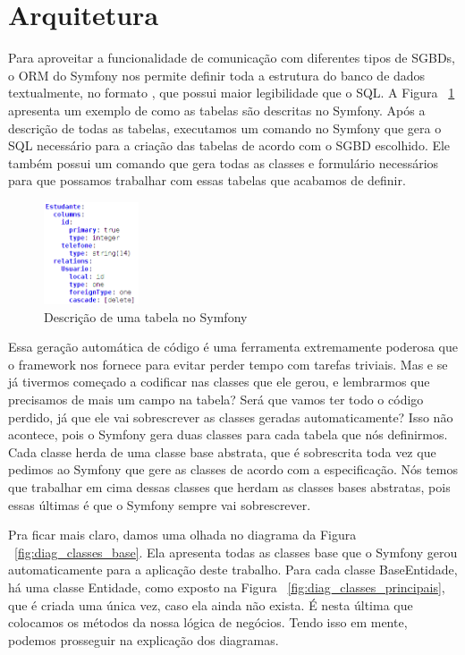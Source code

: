 \section{Arquitetura}
Para aproveitar a funcionalidade de comunicação com diferentes tipos de SGBDs, o ORM
do Symfony nos permite definir toda a estrutura do banco de dados textualmente, no formato
, que possui maior legibilidade que o SQL.
A Figura ~\ref{fig:tabela_yaml} apresenta um exemplo de como as tabelas são descritas no Symfony.
Após a descrição de todas as tabelas, executamos um comando no Symfony que gera o SQL necessário
para a criação das tabelas de acordo com o SGBD escolhido. Ele também possui um comando
que gera todas as classes e formulário necessários para que possamos trabalhar com essas tabelas
que acabamos de definir.

\begin{figure}[htbp]
\centering
\includegraphics[width=0.25\textwidth]{fig/tabela_yaml.png}
\caption{Descrição de uma tabela no Symfony}
\label{fig:tabela_yaml}
\end{figure}

Essa geração automática de código é uma ferramenta extremamente poderosa que o framework nos
fornece para evitar perder tempo com tarefas triviais. Mas e se já tivermos começado a codificar
nas classes que ele gerou, e lembrarmos que precisamos de mais um campo na tabela? Será que
vamos ter todo o código perdido, já que ele vai sobrescrever as classes geradas automaticamente?
Isso não acontece, pois o Symfony gera duas classes para cada tabela que nós definirmos. Cada classe
herda de uma classe base abstrata, que é sobrescrita toda vez que pedimos ao Symfony que gere
as classes de acordo com a especificação. Nós temos que trabalhar em cima dessas classes que
herdam as classes bases abstratas, pois essas últimas é que o Symfony sempre vai sobrescrever.

Pra ficar mais claro, damos uma olhada no diagrama da Figura ~\ref{fig:diag_classes_base}. Ela
apresenta todas as classes base que o Symfony gerou automaticamente para a aplicação deste trabalho.
Para cada classe BaseEntidade, há uma classe Entidade, como exposto na Figura ~\ref{fig:diag_classes_principais}, 
que é criada uma única vez, caso ela ainda não exista. É nesta última que colocamos os métodos da nossa 
lógica de negócios. Tendo isso em mente, podemos prosseguir na explicação dos diagramas.

